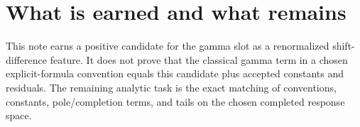 \documentclass[11pt]{article}
\begin{document}
\section{What is earned and what remains}
This note earns a positive candidate for the gamma slot as a renormalized shift-difference feature. It does not prove that the classical gamma term in a chosen explicit-formula convention equals this candidate plus accepted constants and residuals. The remaining analytic task is the exact matching of conventions, constants, pole/completion terms, and tails on the chosen completed response space.
\end{document}
